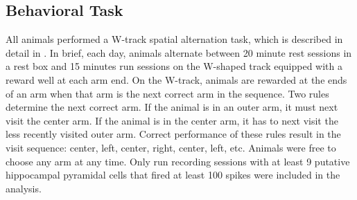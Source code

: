 \documentclass[9pt,lineno]{elife}
\begin{document}
\subsection*{Behavioral Task}
All animals performed a W-track spatial alternation task, which is described in detail in \cite{KarlssonAwakereplayremote2009}. In brief, each day, animals alternate between 20 minute rest sessions in a rest box and 15 minutes run sessions on the W-shaped track equipped with a reward well at each arm end. On the W-track, animals are rewarded at the ends of an arm when that arm is the next correct arm in the sequence. Two rules determine the next correct arm. If the animal is in an outer arm, it must next visit the center arm. If the animal is in the center arm, it has to next visit the less recently visited outer arm. Correct performance of these rules result in the visit sequence: center, left, center, right, center, left, etc. Animals were free to choose any arm at any time. Only run recording sessions with at least 9 putative hippocampal pyramidal cells that fired at least 100 spikes were included in the analysis.
\end{document}
